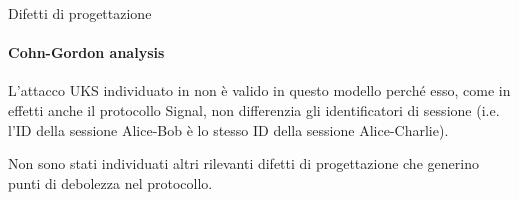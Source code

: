 \begin{frame}{Difetti di progettazione}
    \framesubtitle{Cohn-Gordon analysis \cite{7961996}}
    
    L'attacco UKS individuato in \cite{7467371} non è valido in questo modello perché esso, come in effetti anche il protocollo Signal, non differenzia gli identificatori di sessione (i.e. l'ID della sessione Alice-Bob è lo stesso ID della sessione Alice-Charlie). \linebreak\pause

    Non sono stati individuati altri rilevanti difetti di progettazione che generino punti di debolezza nel protocollo.

\end{frame}

